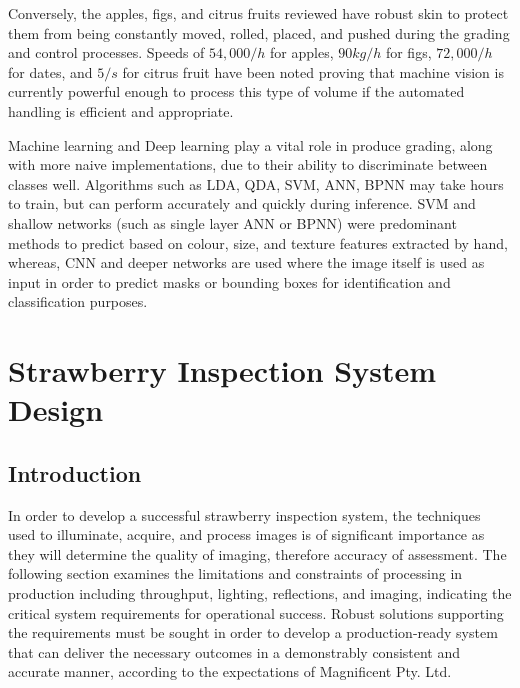 \documentclass[fleqn,twoside,12pt]{report}
\begin{document}
Conversely, the apples, figs, and citrus fruits reviewed have robust skin to protect them from being constantly moved, rolled, placed, and pushed during the grading and control processes. Speeds of $54,000/h$ for apples, $90kg/h$ for figs, $72,000/h$ for dates, and $5/s$ for citrus fruit have been noted proving that machine vision is currently powerful enough to process this type of volume if the automated handling is efficient and appropriate.

Machine learning and Deep learning play a vital role in produce grading, along with more naive implementations, due to their ability to discriminate between classes well. Algorithms such as LDA, QDA, SVM, ANN, BPNN may take hours to train, but can perform accurately and quickly during inference. SVM and shallow networks (such as single layer ANN or BPNN) were predominant methods to predict based on colour, size, and texture features extracted by hand, whereas, CNN and deeper networks are used where the image itself is used as input in order to predict masks or bounding boxes for identification and classification purposes.



 


\newpage

\chapter{Strawberry Inspection System Design}
\label{sec:I}


\section{Introduction}


In order to develop a successful strawberry inspection system, the techniques used to illuminate, acquire, and process images is of significant importance as they will determine the quality of imaging, therefore accuracy of assessment. The following section examines the limitations and constraints of processing in production including throughput, lighting, reflections, and imaging, indicating the critical system requirements for operational success. Robust solutions supporting the requirements must be sought in order to develop a production-ready system that can deliver the necessary outcomes in a demonstrably consistent and accurate manner, according to the expectations of Magnificent Pty. Ltd.
\end{document}
